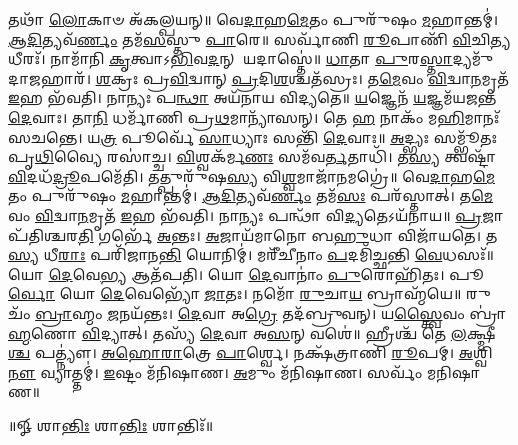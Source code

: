 𑌤𑌥𑌾᳴ \ul{𑌲𑍋}\-𑌕𑌾𑍞 𑌅᳴𑌕𑌲𑍍𑌪𑌯𑌨𑍍॥ 
% 
𑌵𑍇\-\ul{𑌦𑌾}\-𑌹\-\ul{𑌮𑍇}\-𑌤𑌂 𑌪𑍁𑌰𑍁᳴𑌷𑌂 \ul{𑌮}\-𑌹𑌾𑌨𑍍𑌤𑌮𑍍॑। 
\-\ul{𑌆}\-\-\ul{𑌦𑌿}\-𑌤𑍍𑌯𑌵᳴\-\ul{𑌰𑍍𑌣𑌂} 𑌤𑌮᳴\-\ul{𑌸}\-𑌸𑍍𑌤𑍁 \ul{𑌪𑌾}\-𑌰𑍇॥ 
% 
𑌸𑌰𑍍𑌵𑌾᳴𑌣𑌿 \ul{𑌰𑍂}\-𑌪𑌾𑌣𑌿᳴ \ul{𑌵𑌿}\-𑌚𑌿\-\ul{𑌤𑍍𑌯} 𑌧𑍀𑌰𑌃᳴। 
𑌨𑌾𑌮𑌾᳴𑌨𑌿 \ul{𑌕𑍃}\-𑌤𑍍𑌵𑌾𑌽\-\ul{𑌭𑌿}\-𑌵\-\ul{𑌦}\-𑌨𑍍 𑌯𑌦𑌾𑌸𑍍𑌤𑍇॑॥ 
% 
\-\ul{𑌧𑌾}\-𑌤𑌾 \ul{𑌪𑍁}\-𑌰\-\ul{𑌸𑍍𑌤𑌾}\-𑌦𑍍𑌯𑌮𑍁᳴𑌦𑌾\-\ul{𑌜}\-𑌹𑌾𑌰᳴। 
\-\ul{𑌶}\-𑌕𑍍𑌰𑌃 𑌪𑍍𑌰\-\ul{𑌵𑌿}\-𑌦𑍍𑌵𑌾𑌨𑍍  \ul{𑌪𑍍𑌰}\-𑌦𑌿\-\ul{𑌶}\-𑌶𑍍𑌚𑌤᳴𑌸𑍍𑌰𑌃। 
𑌤\-\ul{𑌮𑍇}\-𑌵𑌂 \ul{𑌵𑌿}\-𑌦𑍍𑌵𑌾\-\ul{𑌨}\-𑌮𑍃𑌤᳴ \ul{𑌇}\-𑌹 𑌭᳴𑌵𑌤𑌿। 
𑌨𑌾𑌨𑍍𑌯𑌃 𑌪\-\ul{𑌨𑍍𑌥𑌾} 𑌅𑌯᳴𑌨𑌾𑌯 𑌵𑌿𑌦𑍍𑌯𑌤𑍇॥ 
% 
\-\ul{𑌯}\-𑌜𑍍𑌞𑍇𑌨᳴ \ul{𑌯}\-𑌜𑍍𑌞𑌮᳴𑌯𑌜𑌨𑍍𑌤 \ul{𑌦𑍇}\-𑌵𑌾𑌃। 
𑌤𑌾\-\ul{𑌨𑌿} 𑌧𑌰𑍍𑌮𑌾᳴𑌣𑌿 𑌪𑍍𑌰\-\ul{𑌥}\-𑌮𑌾𑌨𑍍𑌯𑌾᳴𑌸𑌨𑍍। 
𑌤𑍇 \ul{𑌹} 𑌨𑌾𑌕𑌂᳴ 𑌮\-\ul{𑌹𑌿}\-𑌮𑌾𑌨𑌃᳴ 𑌸𑌚𑌨𑍍𑌤𑍇। 
𑌯\-\ul{𑌤𑍍𑌰} 𑌪𑍂𑌰𑍍𑌵𑍇᳴ \ul{𑌸𑌾}\-𑌧𑍍𑌯𑌾𑌃 𑌸𑌨𑍍𑌤𑌿᳴ \ul{𑌦𑍇}\-𑌵𑌾𑌃॥ 
% 
\-\ul{𑌅}\-𑌦𑍍𑌭𑍍𑌯𑌃 𑌸𑌮𑍍𑌭𑍂᳴𑌤𑌃 𑌪𑍃\-\ul{𑌥𑌿}\-𑌵𑍍𑌯𑍈 𑌰𑌸𑌾॑𑌚𑍍𑌚। 
\-\ul{𑌵𑌿}\-𑌶𑍍𑌵𑌕᳴𑌰𑍍𑌮\-\ul{𑌣𑌃} 𑌸𑌮᳴𑌵\-\ul{𑌰𑍍𑌤}\-𑌤𑌾𑌧𑌿᳴। 
𑌤\-\ul{𑌸𑍍𑌯} 𑌤𑍍𑌵𑌷𑍍𑌟𑌾᳴ \ul{𑌵𑌿}\-𑌦𑌧᳴\-\ul{𑌦𑍍𑌰𑍂}\-𑌪𑌮𑍇᳴𑌤𑌿। 
𑌤𑌤𑍍𑌪𑍁𑌰𑍁᳴𑌷\-\ul{𑌸𑍍𑌯} 𑌵𑌿\-\ul{𑌶𑍍𑌵}\-𑌮𑌾𑌜𑌾᳴\-\ul{𑌨}\-𑌮𑌗𑍍𑌰𑍇॑॥ 
% 
𑌵𑍇\-\ul{𑌦𑌾}\-𑌹\-\ul{𑌮𑍇}\-𑌤𑌂 𑌪𑍁𑌰𑍁᳴𑌷𑌂 \ul{𑌮}\-𑌹𑌾𑌨𑍍𑌤𑌮𑍍॑। 
\-\ul{𑌆}\-\-\ul{𑌦𑌿}\-𑌤𑍍𑌯𑌵᳴\-\ul{𑌰𑍍𑌣𑌂} 𑌤𑌮᳴\-\ul{𑌸𑌃} 𑌪𑌰᳴𑌸𑍍𑌤𑌾𑌤𑍍। 
𑌤\-\ul{𑌮𑍇}\-𑌵𑌂 \ul{𑌵𑌿}\-𑌦𑍍𑌵𑌾\-\ul{𑌨}\-𑌮𑍃𑌤᳴ \ul{𑌇}\-𑌹 𑌭᳴𑌵𑌤𑌿। 
𑌨𑌾𑌨𑍍𑌯𑌃 𑌪𑌨𑍍𑌥𑌾᳴ 𑌵𑌿\-\ul{𑌦𑍍𑌯}\-𑌤𑍇𑌽𑌯᳴𑌨𑌾𑌯॥ 
% 
\-\ul{𑌪𑍍𑌰}\-𑌜𑌾𑌪᳴𑌤𑌿𑌶𑍍𑌚𑌰\-\ul{𑌤𑌿} 𑌗𑌰𑍍𑌭𑍇᳴ \ul{𑌅}\-𑌨𑍍𑌤𑌃। 
\-\ul{𑌅}\-𑌜𑌾𑌯᳴𑌮𑌾𑌨𑍋 𑌬\-\ul{𑌹𑍁}\-𑌧𑌾 𑌵𑌿𑌜𑌾᳴𑌯𑌤𑍇। 
𑌤\-\ul{𑌸𑍍𑌯} 𑌧𑍀\-\ul{𑌰𑌾𑌃} 𑌪𑌰𑌿᳴𑌜𑌾𑌨\-\ul{𑌨𑍍𑌤𑌿} 𑌯𑍋𑌨𑌿𑌮𑍍॑। 
𑌮𑌰𑍀᳴𑌚𑍀𑌨𑌾𑌂 \ul{𑌪}\-𑌦𑌮𑌿᳴𑌚𑍍𑌛𑌨𑍍𑌤𑌿 \ul{𑌵𑍇}\-𑌧𑌸𑌃᳴॥ 
% 
𑌯𑍋 \ul{𑌦𑍇}\-𑌵𑍇\-\ul{𑌭𑍍𑌯} 𑌆𑌤᳴𑌪𑌤𑌿। 
𑌯𑍋 \ul{𑌦𑍇}\-𑌵𑌾𑌨𑌾𑌂॑ \ul{𑌪𑍁}\-𑌰𑍋𑌹𑌿᳴𑌤𑌃। 
𑌪𑍂\-\ul{𑌰𑍍𑌵𑍋} 𑌯𑍋 \ul{𑌦𑍇}\-𑌵𑍇𑌭𑍍𑌯𑍋᳴ \ul{𑌜𑌾}\-𑌤𑌃। 
𑌨𑌮𑍋᳴ \ul{𑌰𑍁}\-𑌚𑌾\-\ul{𑌯} 𑌬𑍍𑌰𑌾𑌹𑍍𑌮᳴𑌯𑍇॥ 
% 
𑌰𑍁𑌚𑌂᳴ \ul{𑌬𑍍𑌰𑌾}\-𑌹𑍍𑌮𑌂 \ul{𑌜}\-𑌨𑌯᳴𑌨𑍍𑌤𑌃। 
\-\ul{𑌦𑍇}\-𑌵𑌾 𑌅\-\ul{𑌗𑍍𑌰𑍇} 𑌤𑌦᳴𑌬𑍍𑌰𑍁𑌵𑌨𑍍। 
𑌯\-\ul{𑌸𑍍𑌤𑍍𑌵𑍈}\-𑌵𑌂 𑌬𑍍𑌰𑌾॑\-\ul{𑌹𑍍𑌮}\-𑌣𑍋 \ul{𑌵𑌿}\-𑌦𑍍𑌯𑌾𑌤𑍍। 
𑌤𑌸𑍍𑌯᳴ \ul{𑌦𑍇}\-𑌵𑌾 𑌅\-\ul{𑌸}\-𑌨𑍍 𑌵𑌶𑍇॑॥ 
% 
𑌹𑍍𑌰𑍀𑌶𑍍𑌚᳴ 𑌤𑍇 \ul{𑌲}\-𑌕𑍍𑌷𑍍𑌮𑍀\-\ul{𑌶𑍍𑌚} 𑌪𑌤𑍍𑌨𑍍𑌯𑍗॑। 
\-\ul{𑌅}\-\-\ul{𑌹𑍋}\-\-\ul{𑌰𑌾}\-𑌤𑍍𑌰𑍇 \ul{𑌪𑌾}\-𑌰𑍍𑌶𑍍𑌵𑍇। 
𑌨𑌕𑍍𑌷᳴𑌤𑍍𑌰𑌾𑌣𑌿 \ul{𑌰𑍂}\-𑌪𑌮𑍍। 
\-\ul{𑌅}\-𑌶𑍍𑌵𑌿\-\ul{𑌨𑍗} 𑌵𑍍𑌯𑌾𑌤𑍍𑌤𑌮𑍍॑। 
\-\ul{𑌇}\-𑌷𑍍𑌟𑌂 𑌮᳴𑌨𑌿𑌷𑌾𑌣। 
\-\ul{𑌅}\-𑌮𑍁𑌂 𑌮᳴𑌨𑌿𑌷𑌾𑌣। 
𑌸𑌰𑍍𑌵𑌂᳴ 𑌮𑌨𑌿𑌷𑌾𑌣॥ 
% 


\centerline{॥𑍐 𑌶𑌾\-\ul{𑌨𑍍𑌤𑌿𑌃} 𑌶𑌾\-\ul{𑌨𑍍𑌤𑌿𑌃} 𑌶𑌾𑌨𑍍𑌤𑌿𑌃᳴॥}
